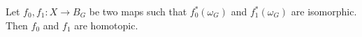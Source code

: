 Let $f_0, f_1: X \rightarrow B_G$ be two maps such that $f_0^*(\omega_G)$ and $f_1^*(\omega_G)$ are isomorphic. Then $f_0$ and $f_1$ are homotopic.
